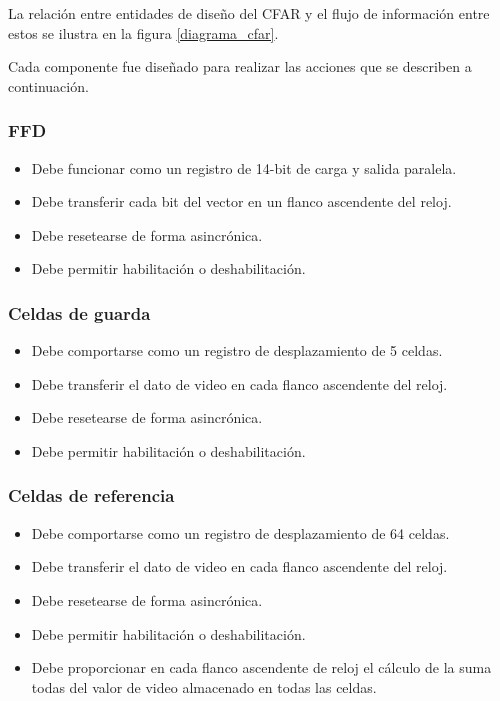 La relación entre entidades de diseño del CFAR y el flujo de información entre estos se ilustra en la figura \ref{diagrama_cfar}.

Cada componente fue diseñado para realizar las acciones que se describen a continuación.

\subsubsection{FFD}
\begin{itemize}
\item Debe funcionar como un registro de 14-bit de carga y salida paralela.
\item Debe transferir cada bit del vector en un flanco ascendente del reloj.
\item Debe resetearse de forma asincrónica.
\item Debe permitir habilitación o deshabilitación.
\end{itemize}



\subsubsection{Celdas de guarda}
\begin{itemize}
\item Debe comportarse como un registro de desplazamiento de 5 celdas.
\item Debe transferir el dato de video en cada flanco ascendente del reloj.
\item Debe resetearse de forma asincrónica.
\item Debe permitir habilitación o deshabilitación.
\end{itemize}


\subsubsection{Celdas de referencia}
\begin{itemize}
\item Debe comportarse como un registro de desplazamiento de 64 celdas.
\item Debe transferir el dato de video en cada flanco ascendente del reloj.
\item Debe resetearse de forma asincrónica.
\item Debe permitir habilitación o deshabilitación.
\item Debe proporcionar en cada flanco ascendente de reloj el cálculo de la suma todas del valor de video almacenado en todas las celdas.
\end{itemize}



